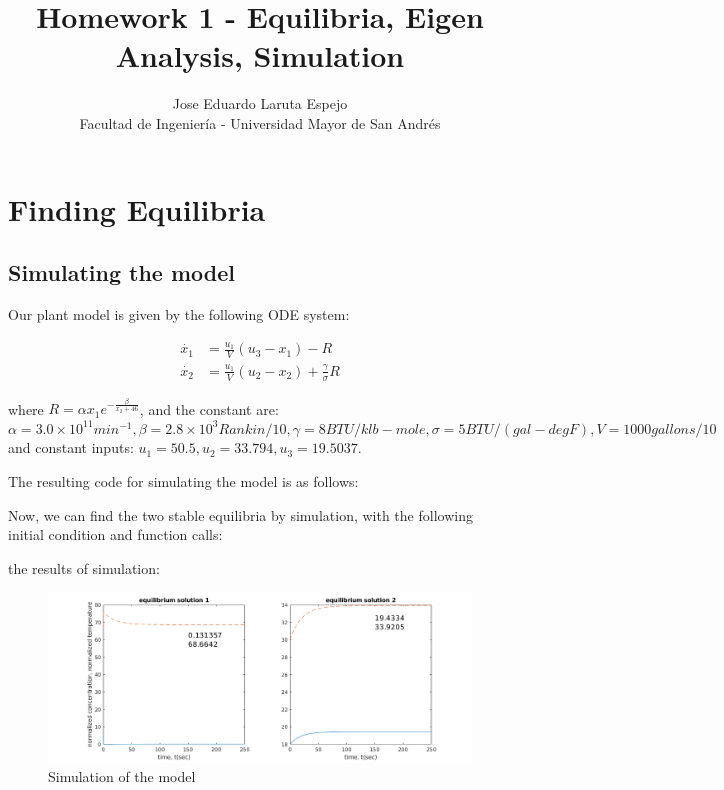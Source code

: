 \documentclass[12pt,letterpaper]{article}
\title{Homework 1 - Equilibria, Eigen Analysis, Simulation}
\author{Jose Eduardo Laruta Espejo \\ Facultad de Ingeniería - Universidad Mayor de San Andrés}
\begin{document}
\maketitle
\section{Finding Equilibria}

\subsection{Simulating the model}
Our plant model is given by the following ODE system:

\begin{align} 
    \dot{x_1} &= \frac{u_1}{V}(u_3 - x_1) - R \label{eq:exo1} \\
    \dot{x_2} &= \frac{u_1}{V}(u_2 - x_2) + \frac{\gamma}{\sigma}R \label{eq:exo2}
\end{align}

where $R = \alpha x_1 e^{-\frac{\beta}{x_2 + 46}}$, and the constant are: $\alpha = 3.0 \times 10^{11} min^{-1}, 
\beta = 2.8 \times 10^3 Rankin/10, \gamma = 8 BTU/klb-mole, \sigma = 5 BTU/(gal-deg F), V = 1000 gallons/10$
and constant inputs: $u_1 = 50.5, u_2 = 33.794, u_3 = 19.5037$.

The resulting code for simulating the model is as follows:



Now, we can find the two stable equilibria by simulation, with the following initial condition and function calls:


the results of simulation:

\begin{figure}[!h] 
\centering
\includegraphics[width=1.1\textwidth]{../matlab/img/simu.png}
\caption{Simulation of the model}
\label{fig:simu}
\end{figure}
\end{document}
